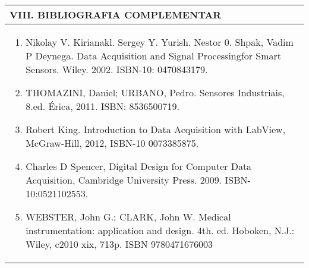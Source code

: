 \documentclass[12pt]{article}
\begin{document}
\newpage

\begin{longtable}{|L{1.025\textwidth}|} \hline
%
{\bf VIII. BIBLIOGRAFIA COMPLEMENTAR} \\ \hline
\begin{enumerate}
\item Nikolay V. Kirianakl. Sergey Y. Yurish. Nestor 0. Shpak, Vadim P Deynega. Data Acquisition and Signal Processingfor Smart Sensors. Wiley. 2002. ISBN-10: 0470843179. 
\item  THOMAZINI, Daniel; URBANO, Pedro. Sensores Industriais, 8.ed. Érica, 2011. ISBN: 8536500719.
\item  Robert King. Introduction to Data Acquisition with LabView, McGraw-Hill, 2012, ISBN-10 0073385875. 
\item  Charles D Spencer, Digital Design for Computer Data Acquisition, Cambridge University Press. 2009. ISBN-10:0521102553.
\item  WEBSTER, John G.; CLARK, John W. Medical instrumentation: application and design. 4th. ed. Hoboken, N.J.: Wiley, c2010 xix, 713p. ISBN 9780471676003



%
\end{enumerate}
 \\ \hline
\end{longtable}



\end{document}
